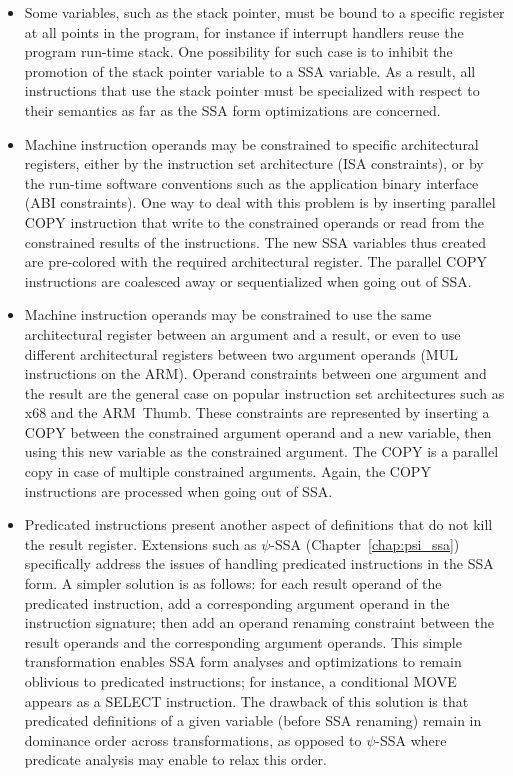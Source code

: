 \begin{itemize}
\item Some variables, such as the stack pointer, must be bound to a specific
register at all points in the program, for instance if interrupt handlers reuse
the program run-time stack. One possibility for such case is to inhibit the
promotion of the stack pointer variable to a SSA variable. As a result, all
instructions that use the stack pointer must be specialized with respect to
their semantics as far as the SSA form optimizations are concerned.

\item Machine instruction operands may be constrained to specific architectural
registers, either by the instruction set architecture (ISA constraints), or by
the run-time software conventions such as the application binary interface (ABI
constraints). One way to deal with this problem is by inserting parallel COPY
instruction that write to the constrained operands or read from the constrained
results of the instructions. The new SSA variables thus created are pre-colored
with the required architectural register. The parallel COPY instructions are
coalesced away or sequentialized when going out of SSA.

\item Machine instruction operands may be constrained to use the same
architectural register between an argument and a result, or even to use
different architectural registers between two argument operands (MUL
instructions on the ARM). Operand constraints between one argument and the
result are the general case on popular instruction set architectures such as
x68 and the ARM~Thumb. These constraints are represented by inserting a COPY
between the constrained argument operand and a new variable, then using this new
variable as the constrained argument. The COPY is a parallel copy in case of
multiple constrained arguments. Again, the COPY instructions are processed when
going out of SSA.

\item Predicated instructions present another aspect of definitions that do not
kill the result register. Extensions such as $\psi$-SSA
(Chapter~\ref{chap:psi_ssa}) specifically address the issues of handling
predicated instructions in the SSA form. A simpler solution is as follows: for
each result operand of the predicated instruction, add a corresponding argument
operand in the instruction signature; then add an operand renaming constraint
between the result operands and the corresponding argument operands. This simple
transformation enables SSA form analyses and optimizations to remain oblivious
to predicated instructions; for instance, a conditional MOVE appears as a SELECT
instruction. The drawback of this solution is that predicated definitions of a
given variable (before SSA renaming) remain in dominance order across
transformations, as opposed to $\psi$-SSA where predicate analysis may enable to
relax this order.

\end{itemize}


